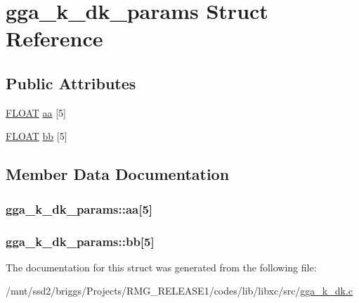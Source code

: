 \hypertarget{structgga__k__dk__params}{\section{gga\-\_\-k\-\_\-dk\-\_\-params Struct Reference}
\label{structgga__k__dk__params}
}
\subsection*{Public Attributes}
\begin{DoxyCompactItemize}
\item 
\hyperlink{src_2xc__config_8h_ae8690abbffa85934d64d545920e2b108}{F\-L\-O\-A\-T} \hyperlink{structgga__k__dk__params_a78ace172c13e52e63de1d912096e32cc}{aa} \mbox{[}5\mbox{]}
\item 
\hyperlink{src_2xc__config_8h_ae8690abbffa85934d64d545920e2b108}{F\-L\-O\-A\-T} \hyperlink{structgga__k__dk__params_a5045a90722c9bf00aecd7055d1c257ff}{bb} \mbox{[}5\mbox{]}
\end{DoxyCompactItemize}


\subsection{Member Data Documentation}
\hypertarget{structgga__k__dk__params_a78ace172c13e52e63de1d912096e32cc}{
\subsubsection[{aa}]{ gga\-\_\-k\-\_\-dk\-\_\-params\-::aa\mbox{[}5\mbox{]}}}\label{structgga__k__dk__params_a78ace172c13e52e63de1d912096e32cc}
\hypertarget{structgga__k__dk__params_a5045a90722c9bf00aecd7055d1c257ff}{
\subsubsection[{bb}]{ gga\-\_\-k\-\_\-dk\-\_\-params\-::bb\mbox{[}5\mbox{]}}}\label{structgga__k__dk__params_a5045a90722c9bf00aecd7055d1c257ff}


The documentation for this struct was generated from the following file\-:\begin{DoxyCompactItemize}
\item 
/mnt/ssd2/briggs/\-Projects/\-R\-M\-G\-\_\-\-R\-E\-L\-E\-A\-S\-E1/codes/lib/libxc/src/\hyperlink{gga__k__dk_8c}{gga\-\_\-k\-\_\-dk.\-c}\end{DoxyCompactItemize}
